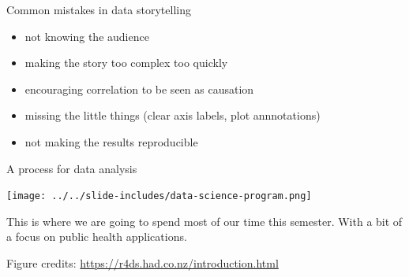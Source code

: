 \documentclass[table]{beamer}\usepackage[]{graphicx}\usepackage[]{color}
\begin{document}


\begin{frame}{Common mistakes in data storytelling}

\begin{itemize}
    \item not knowing the audience
    \item making the story too complex too quickly
    \item encouraging correlation to be seen as causation
    \item missing the little things (clear axis labels, plot annnotations)
    \item not making the results reproducible
\end{itemize}

\end{frame}




\begin{frame}{A process for data analysis}

\texttt{[image: ../../slide-includes/data-science-program.png]}

\bigskip

This is where we are going to spend most of our time this semester. With a bit of a focus on public health applications. 

\bigskip

 \tiny Figure credits: \url{https://r4ds.had.co.nz/introduction.html}

\end{frame}
\end{document}
